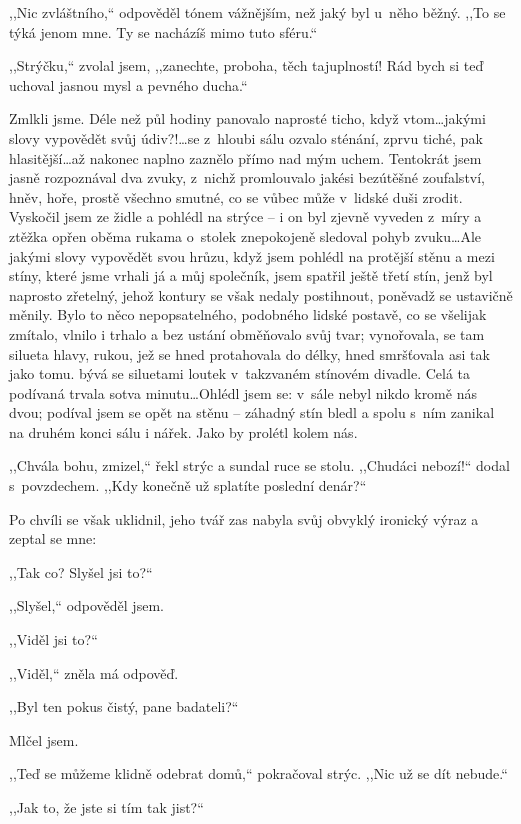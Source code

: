 ,,Nic zvláštního,`` odpověděl tónem vážnějším, než jaký byl u~něho běžný. ,,To se týká jenom mne. Ty se nacházíš mimo tuto sféru.``

,,Strýčku,`` zvolal jsem, ,,zanechte, proboha, těch tajuplností! Rád bych si teď uchoval jasnou mysl a pevného ducha.``

Zmlkli jsme. Déle než půl hodiny panovalo naprosté ticho, když vtom\ldots jakými slovy vypovědět svůj údiv?!\ldots se z hloubi sálu ozvalo sténání, zprvu tiché, pak hlasitější\ldots až nakonec naplno zaznělo přímo nad mým uchem. Tentokrát jsem jasně rozpoznával dva zvuky, z nichž promlouvalo jakési bezútěšné zoufalství, hněv, hoře, prostě všechno smutné, co se vůbec může v lidské duši zrodit. Vyskočil jsem ze židle a pohlédl na strýce – i on byl zjevně vyveden z míry a ztěžka opřen oběma rukama o~stolek znepokojeně sledoval pohyb zvuku\ldots Ale jakými slovy vypovědět svou hrůzu, když jsem pohlédl na protější stěnu a mezi stíny, které jsme vrhali já a můj společník, jsem spatřil ještě třetí stín, jenž byl naprosto zřetelný, jehož kontury se však nedaly postihnout, poněvadž se ustavičně měnily. Bylo to něco nepopsatelného, podobného lidské postavě, co se všelijak zmítalo, vlnilo i trhalo a bez ustání obměňovalo svůj tvar; vynořovala, se tam silueta hlavy, rukou, jež se hned protahovala do délky, hned smršťovala asi tak jako tomu. bývá se siluetami loutek v takzvaném stínovém divadle. Celá ta podívaná trvala sotva minutu\ldots Ohlédl jsem se: v sále nebyl nikdo kromě nás dvou; podíval jsem se opět na stěnu – záhadný stín bledl a spolu s ním zanikal na druhém konci sálu i nářek. Jako by prolétl kolem nás.

,,Chvála bohu, zmizel,`` řekl strýc a sundal ruce se stolu. ,,Chudáci nebozí!`` dodal s povzdechem. ,,Kdy konečně už splatíte poslední denár?``

Po chvíli se však uklidnil, jeho tvář zas nabyla svůj obvyklý ironický výraz a zeptal se mne:

,,Tak co? Slyšel jsi to?``

,,Slyšel,`` odpověděl jsem.

,,Viděl jsi to?``

,,Viděl,`` zněla má odpověď.

,,Byl ten pokus čistý, pane badateli?``

Mlčel jsem.

,,Teď se můžeme klidně odebrat domů,`` pokračoval strýc. ,,Nic už se dít nebude.``

,,Jak to, že jste si tím tak jist?``

